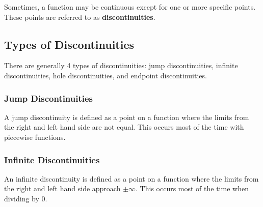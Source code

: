 \documentclass[11pt]{article}
\begin{document}
Sometimes, a function may be continuous except for one or more specific points. These points are referred to as \textbf{discontinuities}.

\subsection{Types of Discontinuities}
There are generally 4 types of discontinuities: jump discontinuities, infinite discontinuities, hole discontinuities, and endpoint discontinuities. 

\subsubsection*{Jump Discontinuities}
A jump discontinuity is defined as a point on a function where the limits from the right and left hand side are not equal. This occurs most of the time with piecewise functions.

\begin{center}
\end{center}

\subsubsection*{Infinite Discontinuities}
An infinite discontinuity is defined as a point on a function where the limits from the right and left hand side approach $\pm\infty$. This occurs most of the time when dividing by $0$.

\begin{center}
\end{center}
\end{document}

